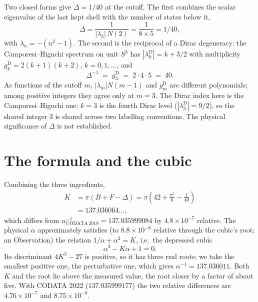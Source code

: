 \documentclass[aps,prl,twocolumn,superscriptaddress]{revtex4-2}
\newcommand{\gvq}[2]{#2}
\begin{document}
Two closed forms give $\Delta = 1/40$ at the cutoff. The first combines
the scalar eigenvalue of the last kept shell with the number of states
below it,
\begin{equation}\label{eq:boundary}
  \Delta = \frac{1}{|\lambda_3|\, N(2)}
         = \frac{1}{8 \times 5} = \gvq{delta_dirac}{1/40},
\end{equation}
with $\lambda_n = -(n^2-1)$. The second is the reciprocal of a Dirac
degeneracy: the Camporesi--Higuchi spectrum on unit $S^3$ has
$|\lambda_k^{\mathrm{D}}| = k + 3/2$ with multiplicity
$g_k^{\mathrm{D}} = 2(k+1)(k+2)$, $k = 0, 1, \ldots$, and
\begin{equation}\label{eq:Delta_dirac}
  \Delta^{-1} \;=\; g_3^{\mathrm{D}} \;=\; 2 \cdot 4 \cdot 5 \;=\; 40 .
\end{equation}
As functions of the cutoff $m$, $|\lambda_m|N(m-1)$ and
$g_m^{\mathrm{D}}$ are different polynomials; among positive integers
they agree only at $m = 3$. The Dirac index here is the
Camporesi--Higuchi one: $k = 3$ is the fourth Dirac level
($|\lambda_3^{\mathrm{D}}| = 9/2$), so the shared integer $3$ is shared
across two labelling conventions. The physical significance of $\Delta$
is not established.


\section{The formula and the cubic}\label{sec:formula}

Combining the three ingredients,
\begin{equation}\label{eq:K}
\begin{split}
  K &= \pi\!\left(B + F - \Delta\right)
     = \pi\!\left(42 + \frac{\pi^2}{6} - \frac{1}{40}\right)\\
    &= 137.036064\ldots,
\end{split}
\end{equation}
which differs from $\alpha^{-1}_{\mathrm{CODATA\,2018}} = 137.035999084$
by $4.8\times10^{-7}$ relative. The physical $\alpha$ approximately
satisfies (to $8.8\times10^{-8}$ relative through the cubic's root; an
Observation) the relation $1/\alpha + \alpha^2 = K$, i.e.\ the depressed
cubic
\begin{equation}\label{eq:cubic}
  \alpha^3 - K\alpha + 1 = 0 .
\end{equation}
Its discriminant $4K^3 - 27$ is positive, so it has three real roots;
we take the smallest positive one, the perturbative one, which gives
$\alpha^{-1} = 137.036011$. Both $K$ and the root lie above the
measured value, the root closer by a factor of about five. With CODATA
2022 ($137.035999177$) the two relative differences are
$4.76\times10^{-7}$ and $8.75\times10^{-8}$.
\end{document}
